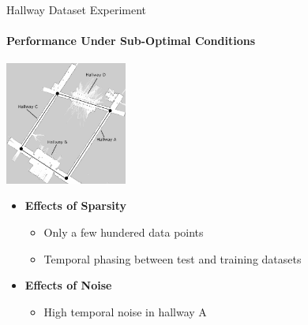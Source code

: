 \documentclass{beamer}
\begin{document}
\begin{frame}[t]{Hallway Dataset Experiment}
  \framesubtitle{Performance Under Sub-Optimal Conditions}

  \centering
  \includegraphics[width=4.0cm]{images/ROPOD_nodes.png}

  \begin{itemize}
    \setlength\itemsep{1em}
  \item \textbf{Effects of Sparsity}
    \begin{itemize}
      \item Only a few hundered data points
      \item Temporal phasing between test and training datasets
    \end{itemize}
  \item \textbf{Effects of Noise}
    \begin{itemize}
      \item High temporal noise in hallway A
    \end{itemize}
  \end{itemize}
\end{frame}
\end{document}
